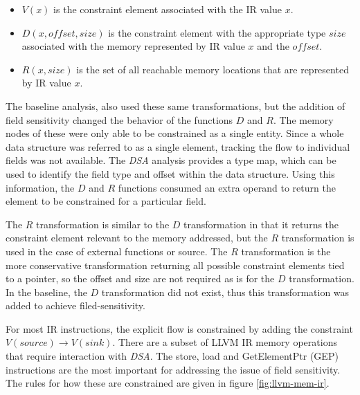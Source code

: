    \begin{itemize}
   \item $V(x)$ is the constraint element associated with the IR value $x$.
   \item $D(x, offset, size)$ is the constraint element with the appropriate
     type $size$ associated with the memory represented by IR value $x$ and the
     $offset$.
   \item $R(x, size)$ is the set of all reachable memory locations that are
     represented by IR value $x$.
   \end{itemize}

   The baseline analysis, also used these same transformations, but the addition
   of field sensitivity changed the behavior of the functions $D$ and $R$. The
   memory nodes of these were only able to be constrained as a single entity.
   Since a whole data structure was referred to as a single element, tracking
   the flow to individual fields was not available. The \textit{DSA} analysis
   provides a type map, which can be used to identify the field type and offset
   within the data structure. Using this information, the $D$ and $R$ functions
   consumed an extra operand to return the element to be constrained for a
   particular field.

   The $R$ transformation is similar to the $D$ transformation in that it
   returns the constraint element relevant to the memory addressed, but the $R$
   transformation is used in the case of external functions or source. The $R$
   transformation is the more conservative transformation returning all possible
   constraint elements tied to a pointer, so the offset and size are not
   required as is for the $D$ transformation. In the baseline, the $D$
   transformation did not exist, thus this transformation was added to achieve
   filed-sensitivity.

   For most IR instructions, the explicit flow is constrained by adding the
   constraint $V(source) \rightarrow V(sink)$. There are a subset of LLVM IR
   memory operations that require interaction with \textit{DSA}. The
   store, load and GetElementPtr (GEP) instructions are the most important for
   addressing the issue of field sensitivity. The rules for how these are
   constrained are given in figure \ref{fig:llvm-mem-ir}.

